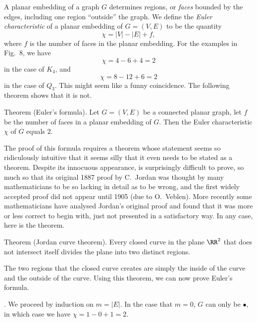 A planar embedding of a graph $G$ determines regions, or {\it faces} bounded by the edges,
including one region ``outside'' the graph.
We define the {\it Euler characteristic}
of a planar embedding of $G = (V,E)$ to be the quantity
$$\chi = |V| - |E| + f,$$
where $f$ is the number of faces in the planar embedding.
For the examples in Fig.~8, we have
$$\chi = 4 - 6 + 4 = 2$$
in the case of $K_4$, and
$$\chi = 8 - 12 + 6 = 2$$
in the case of $Q_3$. This might seem like a funny coincidence. The following theorem shows that
it is not.

\edef\thmeulersformula{\the\thmcount}
\parenproclaim Theorem {\advthm} (Euler's formula). Let $G = (V,E)$ be a connected planar graph,
let $f$ be the number of faces in a planar embedding of $G$. Then the Euler
characteristic $\chi$ of $G$ equals $2$.

The proof of this formula requires a theorem whose statement seems so ridiculously intuitive
that it seems silly that it even needs to be stated as a theorem. Despite its innocuous
appearance, is surprisingly difficult to prove, so much so that its original 1887 proof by
C.~Jordan was thought by many mathematicians to be so lacking in detail as to be wrong, and
the first widely accepted proof did not appear until 1905 (due to O.~Veblen). More recently
some mathematicians have analysed Jordan's original proof and found that it was more or less
correct to begin with, just not presented in a satisfactory way. In any case, here is the theorem.

\parenproclaim Theorem {\advthm} (Jordan curve theorem). Every closed curve in the plane
$\RR^2$ that does not intersect itself divides the plane into two distinct regions.\slug

The two regions that the closed curve creates are simply the inside of the curve and the outside
of the curve. Using this theorem, we can now prove Euler's formula.

\medskip\noindent{\it Proof of Theorem~\thmeulersformula}.\enspace
We proceed by induction on $m = |E|$. In the case that $m=0$, $G$ can only be $\bullet$,
in which case we have $\chi = 1 - 0 + 1 = 2$.

